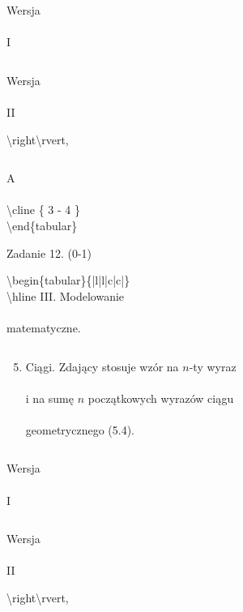 \documentclass[10pt]{article}
\begin{document}
 \begin{tabular}{c}
\end{tabular}

Wersja \\
\\
I

 \begin{tabular}{c}
\end{tabular}

Wersja \\
\\
II

 \textbackslash right\textbackslash rvert, \begin{tabular}{c}
\end{tabular}

A \\
\\
\textbackslash cline \{ 3 - 4 \}\\
\textbackslash end\{tabular\}

Zadanie 12. (0-1)

$\left.$\textbackslash begin\{tabular\}\{|l|l|c|c|\}\\
\textbackslash hline III. Modelowanie \\
\\
matematyczne.

 \begin{tabular}{l}
\end{tabular}

\begin{enumerate}
  \setcounter{enumi}{4}
  \item Ciągi. Zdający stosuje wzór na $n$-ty wyraz \\
\\
i na sumę $n$ początkowych wyrazów ciągu \\
\\
geometrycznego (5.4).
\end{enumerate}

 \begin{tabular}{c}
\end{tabular}

Wersja \\
\\
I

 \begin{tabular}{c}
\end{tabular}

Wersja \\
\\
II

 \textbackslash right\textbackslash rvert, \begin{tabular}{c}
\end{tabular}
\end{document}
